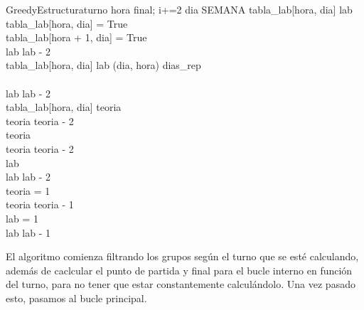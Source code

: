 \begin{pseudocode}{GreedyEstructura}{turno}
   		\FOR hora  \TO final; i+=2 \DO
   		\BEGIN
   		   \FOR dia \in SEMANA \DO
           \BEGIN
                \IF \NOT tabla\_lab[hora, dia] \AND lab  \THEN
                \BEGIN
                    \\
                    tabla\_lab[hora, dia] = True\\
                    tabla\_lab[hora + 1, dia] = True\\
                    lab \GETS lab - 2\\
                \END
                \ELSEIF tabla\_lab[hora, dia] \AND lab  \AND (dia, hora) \in dias\_rep \THEN
                \BEGIN
                    \\
                    \\
                    lab \GETS lab - 2\\
                \END
                \ELSEIF tabla\_lab[hora, dia] \AND teoria  \THEN
                \BEGIN
                    \\
                    teoria \GETS teoria - 2\\
                \END
                \ELSEIF teoria  \THEN
                \BEGIN
                    \\
                    teoria \GETS teoria - 2\\
                \END
                \ELSEIF lab  \THEN
                \BEGIN
                    \\
                    lab \GETS lab - 2\\
                \END
                \ELSEIF teoria = 1 \THEN
                \BEGIN
                  \\
                  teoria \GETS teoria - 1\\
                \END
                \ELSEIF lab = 1 \THEN
                \BEGIN
                  \\
                  lab \GETS lab - 1\\
                \END
                \ELSE {}
           \END
   		\END
   	\END
\END
\end{pseudocode}

El algoritmo comienza filtrando los grupos según el turno que se esté calculando, además de caclcular el punto de partida y final para el bucle interno en función del turno, para no tener que estar constantemente calculándolo. Una vez pasado esto, pasamos al bucle principal.

